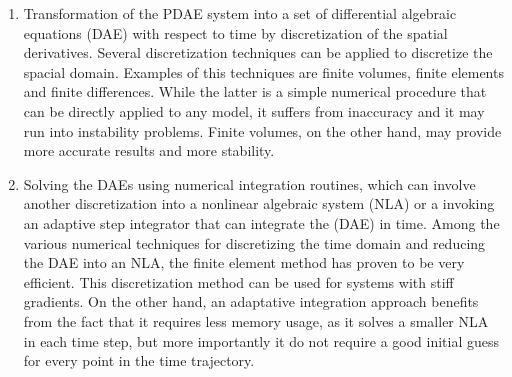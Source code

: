 \documentclass[paper=a4, fontsize=11pt]{scrartcl}
\begin{document}
\begin{enumerate}
\item Transformation of the PDAE system into a set of differential algebraic equations (DAE) with respect to time by discretization of the spatial derivatives. Several discretization techniques can be applied to discretize the spacial domain. Examples of this techniques are finite volumes, finite elements and finite differences. While the latter is a simple numerical procedure that can be directly applied to any model, it suffers from inaccuracy and it may run into instability problems. Finite volumes, on the other hand, may provide more accurate results and more stability. 
\item Solving the DAEs using numerical integration routines, which can involve another discretization into a nonlinear algebraic system (NLA) or a invoking an adaptive step integrator that can integrate the (DAE) in time. Among the various numerical techniques for discretizing the time domain and reducing the DAE into an NLA, the finite element method has proven to be very efficient. This discretization method can be used for systems with stiff gradients. On the other hand, an adaptative integration approach benefits from the fact that it requires less memory usage, as it solves a smaller NLA in each time step, but more importantly it do not require a good initial guess for every point in the time trajectory.
\end{enumerate}
\end{document}
